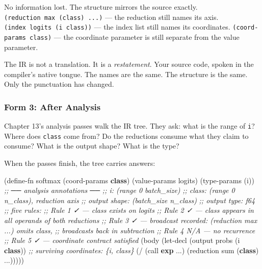 \documentclass[11pt,titlepage]{article}
\newenvironment{Shaded}{}{}
\newcommand{\CommentTok}[1]{\textcolor[rgb]{0.38,0.63,0.69}{\textit{#1}}}
\newcommand{\KeywordTok}[1]{\textcolor[rgb]{0.00,0.44,0.13}{\textbf{#1}}}
\newcommand{\NormalTok}[1]{#1}
\newcommand{\OperatorTok}[1]{\textcolor[rgb]{0.40,0.40,0.40}{#1}}
\begin{document}
No information lost. The structure mirrors the source exactly.
\texttt{(reduction\ max\ (class)\ ...)} --- the reduction still names
its axis. \texttt{(index\ logits\ (i\ class))} --- the index list still
names its coordinates. \texttt{(coord-params\ class)} --- the coordinate
parameter is still separate from the value parameter.

The IR is not a translation. It is a \emph{restatement}. Your source
code, spoken in the compiler's native tongue. The names are the same.
The structure is the same. Only the punctuation has changed.

\vspace{2em}

\hypertarget{form-3-after-analysis}{%
\subsubsection{Form 3: After Analysis}\label{form-3-after-analysis}}

Chapter 13's analysis passes walk the IR tree. They ask: what is the
range of \texttt{i}? Where does \texttt{class} come from? Do the
reductions consume what they claim to consume? What is the output shape?
What is the type?

When the passes finish, the tree carries answers:

\begin{Shaded}
\begin{Highlighting}[]
\NormalTok{(define-fn softmax (coord-params }\KeywordTok{class}\NormalTok{) (value-params logits)}
\NormalTok{  (type-params (i))}
  \CommentTok{;; ── analysis annotations ──}
  \CommentTok{;; i:     (range 0 batch_size)}
  \CommentTok{;; class: (range 0 n_class), reduction axis}
  \CommentTok{;; output shape: (batch_size n_class)}
  \CommentTok{;; output type:  f64}
  \CommentTok{;; five rules:}
  \CommentTok{;;   Rule 1 ✓ — class exists on logits}
  \CommentTok{;;   Rule 2 ✓ — class appears in all operands of both reductions}
  \CommentTok{;;   Rule 3 ✓ — broadcast recorded: (reduction max ...) omits class,}
  \CommentTok{;;              broadcasts back in subtraction}
  \CommentTok{;;   Rule 4 N/A — no recurrence}
  \CommentTok{;;   Rule 5 ✓ — coordinate contract satisfied}
\NormalTok{  (body}
\NormalTok{    (let-decl (output probs (i }\KeywordTok{class}\NormalTok{))}
      \CommentTok{;; surviving coordinates: \{i, class\}}
\NormalTok{      (}\OperatorTok{/}\NormalTok{ (call }\KeywordTok{exp}\NormalTok{ ...) (reduction sum (}\KeywordTok{class}\NormalTok{) ...)))))}
\end{Highlighting}
\end{Shaded}
\end{document}
